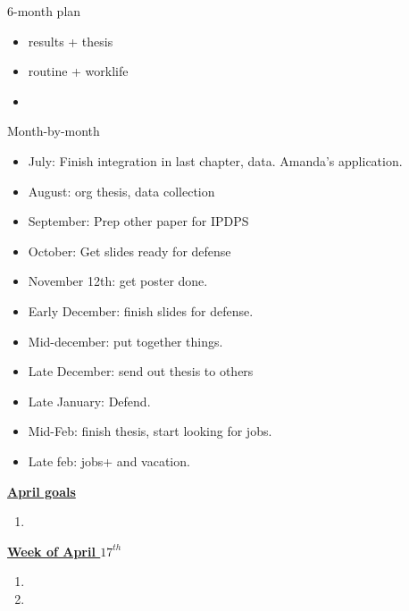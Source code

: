 \documentclass[serif, mathserif, final]{beamer}
\begin{document}
{\begin{frame}{}
\begin{columns}
\begin{column}{0.5\linewidth}
    \begin{block}{ 6-month plan}
      \begin{itemize}
        \small \item \small results + thesis
      \item \small routine + worklife
      \item \small 
      \end{itemize}
    \end{block} 

    \begin{block}{Month-by-month}
      \begin{itemize}
      \item \small July: Finish integration in last chapter,
        data. Amanda's application.
      \item \small August: org thesis, data collection
      \item \small September: Prep other paper for IPDPS
      \item \small October: Get slides ready for defense
      \item \small November 12th: get poster done. 
      \item \small Early December: finish slides for defense.
      \item \small Mid-december: put together things. 
      \item \small Late December: send out thesis to others 
      \item \small Late January: Defend.
      \item \small Mid-Feb: finish thesis, start looking for jobs. 
      \item \small Late feb: jobs+ and vacation. 
      \end{itemize}
    \end{block}
    
\begin{block}{\underline{\textbf{April goals}}}
\begin{enumerate}
\small \item \small 
\end{enumerate}
\end{block}

\begin{block}{\small \underline{\textbf{Week of April $17^{th}$}}}
\begin{enumerate}
\tiny \item \tiny 
\item \tiny 
\end{enumerate}
\end{block}
\end{column}


\end{columns}
\end{frame}}
\end{document}
